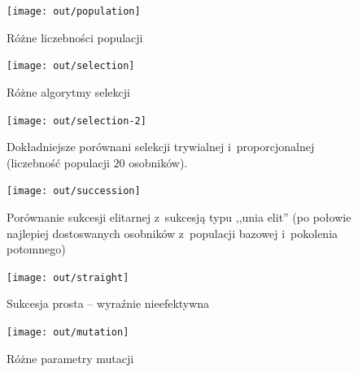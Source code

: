 \documentclass[a4paper,onecolumn,oneside,12pt]{mwart}
\begin{document}
\begin{figure}[hp]
	\begin{center}
		\texttt{[image: out/population]}
	\end{center}
	\caption{Różne liczebności populacji}
	\label{fig:plot:population}
\end{figure}

\begin{figure}[hp]
	\begin{center}
		\texttt{[image: out/selection]}
	\end{center}
	\caption{Różne algorytmy selekcji}
	\label{fig:plot:selection}
\end{figure}

\begin{figure}[hp]
	\begin{center}
		\texttt{[image: out/selection-2]}
	\end{center}
	\caption{Dokładniejsze porównani selekcji trywialnej i~proporcjonalnej
	(liczebność populacji $20$ osobników).}
	\label{fig:plot:selection-2}
\end{figure}

\begin{figure}[hp]
	\begin{center}
		\texttt{[image: out/succession]}
	\end{center}
	\caption{Porównanie sukcesji elitarnej z~sukcesją typu ,,unia elit''
	(po połowie najlepiej dostoswanych osobników z~populacji bazowej
	i~pokolenia potomnego)}
	\label{fig:plot:succession}
\end{figure}

\begin{figure}[hp]
	\begin{center}
		\texttt{[image: out/straight]}
	\end{center}
	\caption{Sukcesja prosta -- wyraźnie nieefektywna}
	\label{fig:plot:straight}
\end{figure}

\begin{figure}[hp]
	\begin{center}
		\texttt{[image: out/mutation]}
	\end{center}
	\caption{Różne parametry mutacji}
	\label{fig:plot:mutation}
\end{figure}
\end{document}
